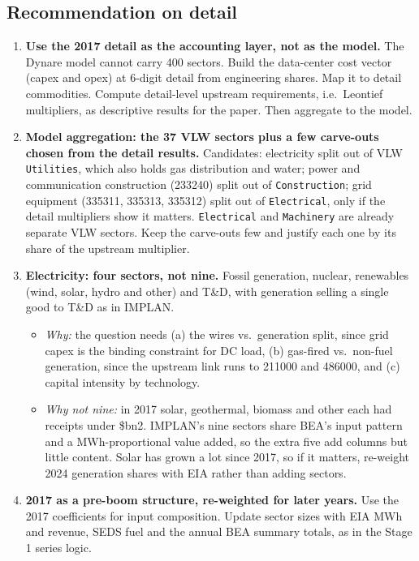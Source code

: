 \documentclass[11pt]{article}
\newcommand{\bn}{\$bn}
\begin{document}
\subsection{Recommendation on detail}
\begin{enumerate}
  \item \textbf{Use the 2017 detail as the accounting layer, not as the model.} The Dynare model cannot carry 400 sectors. Build the data-center cost vector (capex and opex) at 6-digit detail from engineering shares. Map it to detail commodities. Compute detail-level upstream requirements, i.e.\ Leontief multipliers, as descriptive results for the paper. Then aggregate to the model.
  \item \textbf{Model aggregation: the 37 VLW sectors plus a few carve-outs chosen from the detail results.} Candidates: electricity split out of VLW \texttt{Utilities}, which also holds gas distribution and water; power and communication construction (233240) split out of \texttt{Construction}; grid equipment (335311, 335313, 335312) split out of \texttt{Electrical}, only if the detail multipliers show it matters. \texttt{Electrical} and \texttt{Machinery} are already separate VLW sectors. Keep the carve-outs few and justify each one by its share of the upstream multiplier.
  \item \textbf{Electricity: four sectors, not nine.} Fossil generation, nuclear, renewables (wind, solar, hydro and other) and T\&D, with generation selling a single good to T\&D as in IMPLAN.
  \begin{itemize}
    \item \emph{Why:} the question needs (a) the wires vs.\ generation split, since grid capex is the binding constraint for DC load, (b) gas-fired vs.\ non-fuel generation, since the upstream link runs to 211000 and 486000, and (c) capital intensity by technology.
    \item \emph{Why not nine:} in 2017 solar, geothermal, biomass and other each had receipts under \bn2. IMPLAN's nine sectors share BEA's input pattern and a MWh-proportional value added, so the extra five add columns but little content. Solar has grown a lot since 2017, so if it matters, re-weight 2024 generation shares with EIA rather than adding sectors.
  \end{itemize}
  \item \textbf{2017 as a pre-boom structure, re-weighted for later years.} Use the 2017 coefficients for input composition. Update sector sizes with EIA MWh and revenue, SEDS fuel and the annual BEA summary totals, as in the Stage 1 series logic.
\end{enumerate}
\end{document}
